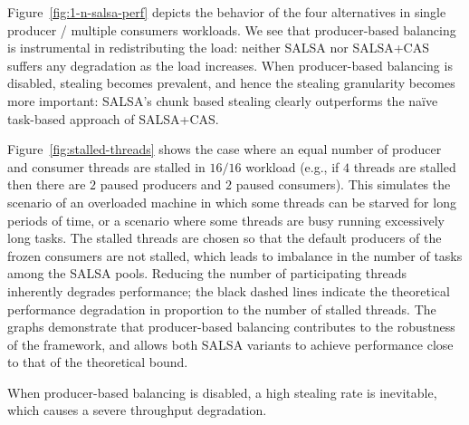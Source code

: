 Figure~\ref{fig:1-n-salsa-perf} depicts the behavior of the four alternatives in single producer / multiple consumers workloads. 
We see that producer-based balancing is instrumental in redistributing the load: neither SALSA nor SALSA+CAS suffers any degradation as the load increases. 
When producer-based balancing is disabled, stealing becomes prevalent, and hence the stealing granularity becomes more important: 
SALSA's chunk based stealing clearly outperforms the na\"{i}ve task-based approach of SALSA+CAS. 

Figure~\ref{fig:stalled-threads} shows the case where an equal number of producer and consumer threads are stalled in $16/16$ workload (e.g., if $4$ threads are stalled then there are $2$ paused producers and $2$ paused consumers). This simulates the scenario of an overloaded machine in which some threads can be starved for long periods of time, or a scenario where some threads are busy running excessively long tasks. 
The stalled threads are chosen so that the default producers of the frozen consumers are not stalled, which leads to imbalance in the number of tasks among the SALSA pools. 
Reducing the number of participating threads inherently degrades performance; the black dashed lines indicate the theoretical performance degradation in proportion to the number of stalled threads.
The graphs demonstrate that producer-based balancing contributes to the robustness of the framework, and allows both SALSA variants to achieve performance close to that of the theoretical bound.

When producer-based balancing is disabled, a high stealing rate is inevitable, which causes a severe throughput degradation.

%
%
%
%
